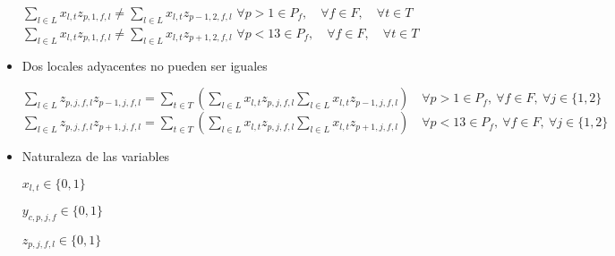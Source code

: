 \documentclass[12pt]{article}
\begin{document}
\begin{itemize}
    $\sum\limits_{l \in L} x_{l,t} z_{p,1,f,l} \neq \sum\limits_{l \in L} x_{l,t} z_{p-1,2,f,l} $ \tab $\forall p > 1 \in P_f, \quad \forall f \in F, \quad \forall t \in T$\\
    
    $\sum\limits_{l \in L} x_{l,t} z_{p,1,f,l} \neq \sum\limits_{l \in L} x_{l,t} z_{p+1,2,f,l} $ \tab $\forall p < 13 \in P_f, \quad \forall f \in F, \quad \forall t \in T$
    
    \item Dos locales adyacentes no pueden ser iguales
    
    \small$\sum\limits_{l \in L} z_{p,j,f,l} z_{p-1,j,f,l} = \sum\limits_{t \in T}\left( \sum\limits_{l \in L} x_{l,t} z_{p,j,f,l} \sum\limits_{l \in L} x_{l,t} z_{p-1,j,f,l}\right) \quad \forall p > 1\in P_f, \ \forall f \in F, \ \forall j \in \{1,2\}$ \\
    
    \small$\sum\limits_{l \in L} z_{p,j,f,l} z_{p+1,j,f,l} = \sum\limits_{t \in T}\left( \sum\limits_{l \in L} x_{l,t} z_{p,j,f,l} \sum\limits_{l \in L} x_{l,t} z_{p+1,j,f,l}\right) \quad \forall p < 13\in P_f, \ \forall f \in F, \ \forall j \in \{1,2\}$ 
    
    \item Naturaleza de las variables
    
    $x_{l,t} \in \{0, 1\}$

    $y_{c, p, j,f} \in \{0, 1\}$
    
    $z_{p, j,f,l} \in \{0, 1\}$
    
\end{itemize}
    
\end{document}
